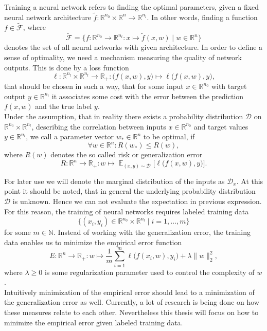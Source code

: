\documentclass[11pt, a4paper]{article}
\newcommand{\N}{\mathbb{N}}
\newcommand{\R}{\mathbb{R}}
\newcommand{\D}{\mathcal{D}}
\newcommand{\F}{\mathcal{F}}
\DeclareMathOperator*{\E}{\mathbb{E}}
\begin{document}
Training a neural network refers to finding the optimal parameters, given a fixed neural network architecture $\tilde{f} : \R^{n_0} \times \R^n \to \R^{n_l}$. In other words, finding a function $f \in \tilde{\F}$, where
\[ \tilde{\F} = \Big \{ f : \R^{n_0} \to \R^{n_l} : x \mapsto \tilde{f}(x,w) \mid w \in \R^n \Big \} \]
denotes the set of all neural networks with given architecture. In order to define a sense of optimality, we need a mechanism measuring the quality of network outputs. This is done by a loss function
\[ \ell: \R^{n_l} \times \R^{n_l} \to \R_+ : \big ( f(x,w),y \big ) \mapsto \ell \big ( f(x,w),y \big ) ,\]
that should be chosen in such a way, that for some input $x \in \R^{n_0}$ with target output $y \in \R^{n_l}$ it associates some cost with the error between the prediction $f(x,w)$ and the true label $y$. \\

Under the assumption, that in reality there exists a probability distribution $\D$ on $\R^{n_0} \times \R^{n_l}$, describing the correlation between inputs $x \in \R^{n_0}$ and target values $y \in \R^{n_l}$, we call a parameter vector $w_* \in \R^n$ to be optimal, if
\[ \forall w \in \R^n : R(w_*) \leq R(w), \]
where $R(w)$ denotes the so called risk or generalization error 
\[ R : \R^n \to \R_+ : w \mapsto \E_{(x,y) \sim \D } \Big [ \ell \big (f(x,w),y \big ) \Big ]. \]

For later use we will denote the marginal distribution of the inputs as $\D_x$. At this point it should be noted, that in general the underlying probability distribution $\D$ is unknown. Hence we can not evaluate the expectation in previous expression. \\

For this reason, the training of neural networks requires labeled training data
\[ \Big \{ (x_i,y_i) \in \R^{n_0} \times \R^{n_l} \mid i=1, \dots, m \Big \} \]
for some $m \in \N$. Instead of working with the generalization error, the training data enables us to minimize the empirical error function
 \[ E : \R^n \to \R_+ : w \mapsto \frac{1}{m} \sum_{i=1}^{m} \ell \big ( f(x_i,w),y_i \big) + \lambda \big \| w \big \|_2^2, \]
where $\lambda \geq 0$ is some regularization parameter used to control the complexity of $w$. \\
 
Intuitively minimization of the empirical error should lead to a minimization of the generalization error as well. Currently, a lot of research is being done on how these measures relate to each other. Nevertheless this thesis will focus on how to minimize the empirical error given labeled training data. \\
\end{document}
